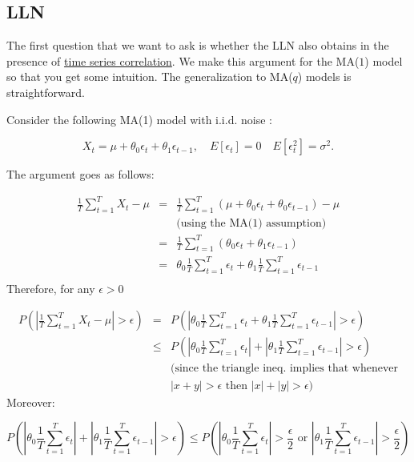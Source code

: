 \documentclass[12] {article}
\begin{document}
\subsection{LLN}
The first question that we want to ask is whether the LLN also obtains in the presence of \underline{time series correlation}. We make this argument for the MA($1$) model so that you get some intuition. The generalization to MA($q$) models is straightforward. 


Consider the following MA(1) model with i.i.d. noise :

\[ X_t = \mu + \theta_0 \epsilon_{t} + \theta_1 \epsilon_{t-1}, \quad E[\epsilon_t]=0 \quad E[\epsilon_t^2]=\sigma^2. \]


The argument goes as follows:

\begin{eqnarray*}
\frac{1}{T} \sum_{t=1}^{T} X_t -\mu&=& \frac{1}{T} \sum_{t=1}^{T} (\mu + \theta_0 \epsilon_t + \theta_0 \epsilon_{t-1}) - \mu\\
&&\textrm{(using the MA(1) assumption)}\\
&=& \frac{1}{T} \sum_{t=1}^{T} (\theta_0 \epsilon_t + \theta_1 \epsilon_{t-1}) \\
&=& \theta_0  \frac{1}{T} \sum_{t=1}^{T}  \epsilon_t + \theta_1 \frac{1}{T} \sum_{t=1}^{T} \epsilon_{t-1}\\
\end{eqnarray*}
Therefore, for any $\epsilon>0$

\begin{eqnarray*}
P \left( \left | \frac{1}{T} \sum_{t=1}^{T} X_t -\mu \right| > \epsilon \right) &=& P \left( \left |  \theta_0\frac{1}{T}\sum_{t=1}^{T}  \epsilon_t + \theta_1 \frac{1}{T} \sum_{t=1}^{T} \epsilon_{t-1} \right| > \epsilon \right) \\
&\leq & P \left( \left |  \theta_0\frac{1}{T}\sum_{t=1}^{T}  \epsilon_t \right |  +\left | \theta_1 \frac{1}{T} \sum_{t=1}^{T} \epsilon_{t-1} \right| > \epsilon \right)\\
&& \textrm{(since the triangle ineq. implies that whenever} \\
&&\textrm{$|x+y|>\epsilon$ then $|x|+|y|>\epsilon)$ }
\end{eqnarray*}
Moreover:

\[ P \left( \left |  \theta_0\frac{1}{T}\sum_{t=1}^{T}  \epsilon_t \right |  +\left | \theta_1 \frac{1}{T} \sum_{t=1}^{T} \epsilon_{t-1} \right| > \epsilon \right) \leq P \left( \left |\theta_0 \frac{1}{T}\sum_{t=1}^{T}  \epsilon_t \right | > \frac{\epsilon}{2}  \textrm {    or  } \left |\theta_1 \frac{1}{T} \sum_{t=1}^{T} \epsilon_{t-1} \right| > \frac{\epsilon}{2} \right)  \]
\end{document}
